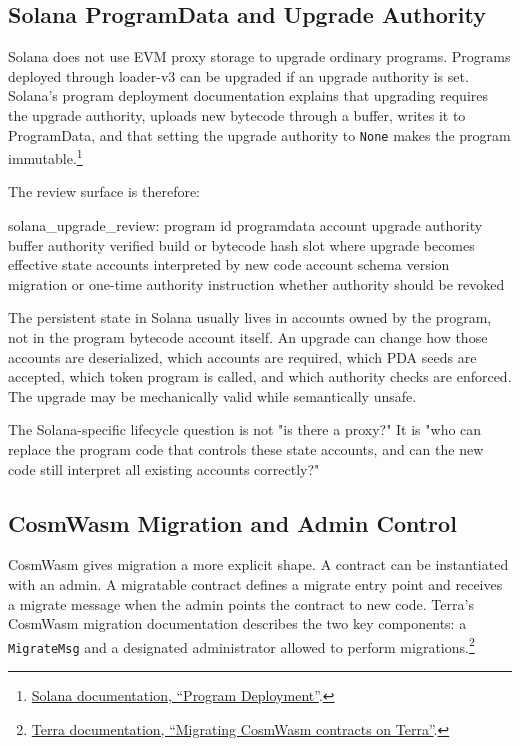 \subsection{Solana ProgramData and Upgrade Authority}

Solana does not use EVM proxy storage to upgrade ordinary programs. Programs deployed through loader-v3 can be upgraded if an upgrade authority is set. Solana's program deployment documentation explains that upgrading requires the upgrade authority, uploads new bytecode through a buffer, writes it to ProgramData, and that setting the upgrade authority to \texttt{None} makes the program immutable.\footnote{\href{https://solana.com/docs/core/programs/program-deployment}{Solana documentation, ``Program Deployment''}.}

The review surface is therefore:

\begin{codeblock}
solana_upgrade_review:
    program id
    programdata account
    upgrade authority
    buffer authority
    verified build or bytecode hash
    slot where upgrade becomes effective
    state accounts interpreted by new code
    account schema version
    migration or one-time authority instruction
    whether authority should be revoked
\end{codeblock}

The persistent state in Solana usually lives in accounts owned by the program, not in the program bytecode account itself. An upgrade can change how those accounts are deserialized, which accounts are required, which PDA seeds are accepted, which token program is called, and which authority checks are enforced. The upgrade may be mechanically valid while semantically unsafe.

The Solana-specific lifecycle question is not "is there a proxy?" It is "who can replace the program code that controls these state accounts, and can the new code still interpret all existing accounts correctly?"

\subsection{CosmWasm Migration and Admin Control}

CosmWasm gives migration a more explicit shape. A contract can be instantiated with an admin. A migratable contract defines a migrate entry point and receives a migrate message when the admin points the contract to new code. Terra's CosmWasm migration documentation describes the two key components: a \texttt{MigrateMsg} and a designated administrator allowed to perform migrations.\footnote{\href{https://docs.terra.money/develop/terrain/contract-migration/}{Terra documentation, ``Migrating CosmWasm contracts on Terra''}.}

